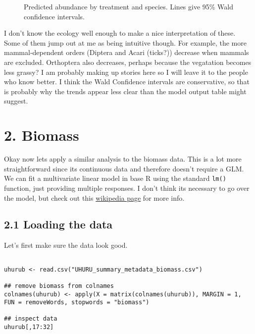 \documentclass[11pt]{article}
\begin{document}
\begin{figure}[htbp]
\centering

\caption{Predicted abundance by treatment and species. Lines give 95\% Wald confidence intervals.}
\end{figure}


I don't know the ecology well enough to make a nice interpretation of these. Some of them jump out at me as being intuitive though. For example, the more mammal-dependent orders (Diptera and Acari (ticks?)) decrease when mammals are excluded. Orthoptera also decreases, perhaps because the vegatation becomes less grassy? I am probably making up stories here so I will leave it to the people who know better. I think the Wald Confidence intervals are conservative, so that is probably why the trends appear less clear than the model output table might suggest.

\section*{2. Biomass}
\label{sec:org85c5198}

Okay now lets apply a similar analysis to the biomass data. This is a lot more straightforward since its continuous data and therefore doesn't require a GLM. We can fit a multivariate linear model in base R using the standard \texttt{lm()} function, just providing multiple responses. I don't think its necessary to go over the model, but check out this \href{https://en.wikipedia.org/wiki/Multivariate\_normal\_distribution}{wikipedia page} for more info.

\subsection*{2.1 Loading the data}
\label{sec:org037fd95}

Let's first make sure the data look good.

\begin{verbatim}

uhurub <- read.csv("UHURU_summary_metadata_biomass.csv")

## remove biomass from colnames
colnames(uhurub) <- apply(X = matrix(colnames(uhurub)), MARGIN = 1, FUN = removeWords, stopwords = "biomass")

## inspect data
uhurub[,17:32]

\end{verbatim}
\end{document}
